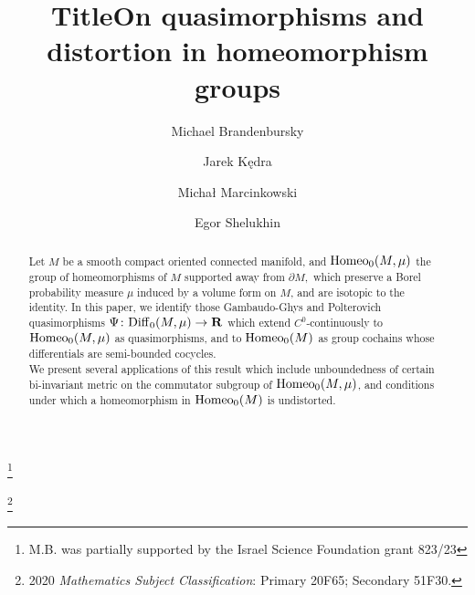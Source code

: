 \documentclass[11pt]{amsart}
\theoremstyle{definition}
\theoremstyle{remark}
\numberwithin{equation}{section}
\numberwithin{figure}{section}
\newcommand{\B}[1]{{\mathbf #1}}
\begin{document}
\title{Title}
\title[On quasimorphisms on homeomorphism groups]{On quasimorphisms and distortion in homeomorphism groups}
\author{Michael Brandenbursky}\thanks{M.B. was partially supported by the Israel Science Foundation grant 823/23}
\address{Department of Mathematics, Ben Gurion University, Israel}
\author{Jarek K\k{e}dra}
\address{Department of Mathematics, University of Aberdeen, UK and University of Szczecin, Poland}
\author{Michał Marcinkowski}
\address{Department of Mathematics, University of Wrocław, Poland}
\author{Egor Shelukhin}%
\address{Department of Mathematics, University of Montreal, Canada}

\begin{abstract}
\noindent Let $M$ be a smooth
compact oriented connected manifold, and ${\rm Homeo}_0(M,\mu)$ the group of homeomorphisms of $M$ supported away from $\partial M,$ which preserve a Borel probability measure $\mu$ induced by a volume form on $M$, and are isotopic to the identity. 
In this paper, we identify those Gambaudo-Ghys and Polterovich quasimorphisms
$\Psi\colon {\rm Diff}_0(M,\mu)\to\B R$ which extend $C^0$-continuously 
to ${\rm Homeo}_0(M,\mu)$ as quasimorphisms, and to ${\rm Homeo}_0(M)$ as group cochains whose differentials are semi-bounded cocycles.\\
\noindent We present several applications of this result which include unboundedness of 
certain bi-invariant metric on the commutator subgroup of ${\rm Homeo}_0(M,\mu)$, and conditions under which a homeomorphism in ${\rm Homeo}_0(M)$ is undistorted.
\end{abstract}

\maketitle


\iffalse

\renewcommand{\thefootnote}{}

\footnote{2020 \emph{Mathematics Subject Classification}: Primary 20F65; Secondary 51F30.}

\end{document}
